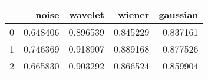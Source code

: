 \begin{tabular}{lrrrr}
\toprule
{} &     noise &   wavelet &    wiener &  gaussian \\
\midrule
0 &  0.648406 &  0.896539 &  0.845229 &  0.837161 \\
1 &  0.746369 &  0.918907 &  0.889168 &  0.877526 \\
2 &  0.665830 &  0.903292 &  0.866524 &  0.859904 \\
\bottomrule
\end{tabular}
